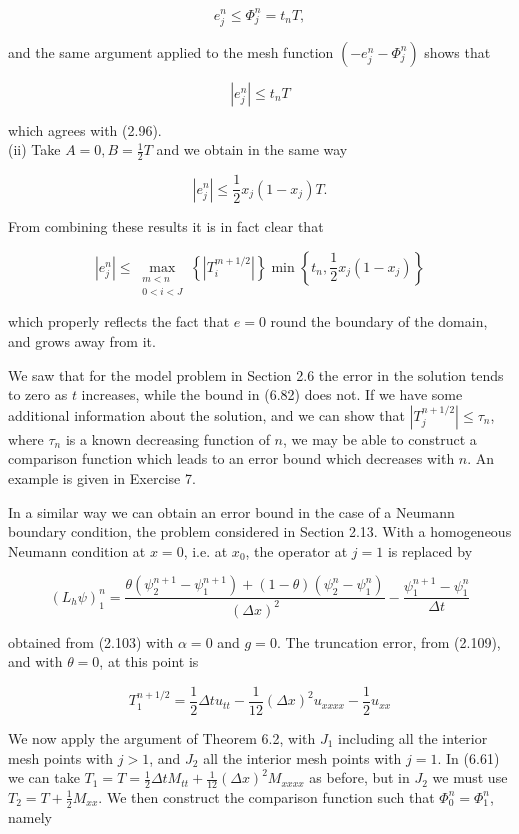 \documentclass[10pt]{article}
\begin{document}
\[
e_{j}^{n} \leq \Phi_{j}^{n}=t_{n} T,
\]

and the same argument applied to the mesh function \(\left(-e_{j}^{n}-\Phi_{j}^{n}\right)\) shows that

\[
\left|e_{j}^{n}\right| \leq t_{n} T
\]

which agrees with (2.96).\\
(ii) Take \(A=0, B=\frac{1}{2} T\) and we obtain in the same way

\[
\left|e_{j}^{n}\right| \leq \frac{1}{2} x_{j}\left(1-x_{j}\right) T .
\]

From combining these results it is in fact clear that

\[
\left|e_{j}^{n}\right| \leq \max _{\substack{m<n \\ 0<i<J}}\left\{\left|T_{i}^{m+1 / 2}\right|\right\} \min \left\{t_{n}, \frac{1}{2} x_{j}\left(1-x_{j}\right)\right\}
\]

which properly reflects the fact that \(e=0\) round the boundary of the domain, and grows away from it.

We saw that for the model problem in Section 2.6 the error in the solution tends to zero as \(t\) increases, while the bound in (6.82) does not. If we have some additional information about the solution, and we can show that \(\left|T_{j}^{n+1 / 2}\right| \leq \tau_{n}\), where \(\tau_{n}\) is a known decreasing function of \(n\), we may be able to construct a comparison function which leads to an error bound which decreases with \(n\). An example is given in Exercise 7.

In a similar way we can obtain an error bound in the case of a Neumann boundary condition, the problem considered in Section 2.13. With a homogeneous Neumann condition at \(x=0\), i.e. at \(x_{0}\), the operator at \(j=1\) is replaced by

\[
\left(L_{h} \psi\right)_{1}^{n}=\frac{\theta\left(\psi_{2}^{n+1}-\psi_{1}^{n+1}\right)+(1-\theta)\left(\psi_{2}^{n}-\psi_{1}^{n}\right)}{(\Delta x)^{2}}-\frac{\psi_{1}^{n+1}-\psi_{1}^{n}}{\Delta t}
\]

obtained from (2.103) with \(\alpha=0\) and \(g=0\). The truncation error, from (2.109), and with \(\theta=0\), at this point is

\[
T_{1}^{n+1 / 2}=\frac{1}{2} \Delta t u_{t t}-\frac{1}{12}(\Delta x)^{2} u_{x x x x}-\frac{1}{2} u_{x x}
\]

We now apply the argument of Theorem 6.2, with \(J_{1}\) including all the interior mesh points with \(j>1\), and \(J_{2}\) all the interior mesh points with \(j=1\). In (6.61) we can take \(T_{1}=T=\frac{1}{2} \Delta t M_{t t}+\frac{1}{12}(\Delta x)^{2} M_{x x x x}\) as before, but in \(J_{2}\) we must use \(T_{2}=T+\frac{1}{2} M_{x x}\). We then construct the comparison function such that \(\Phi_{0}^{n}=\Phi_{1}^{n}\), namely
\end{document}
